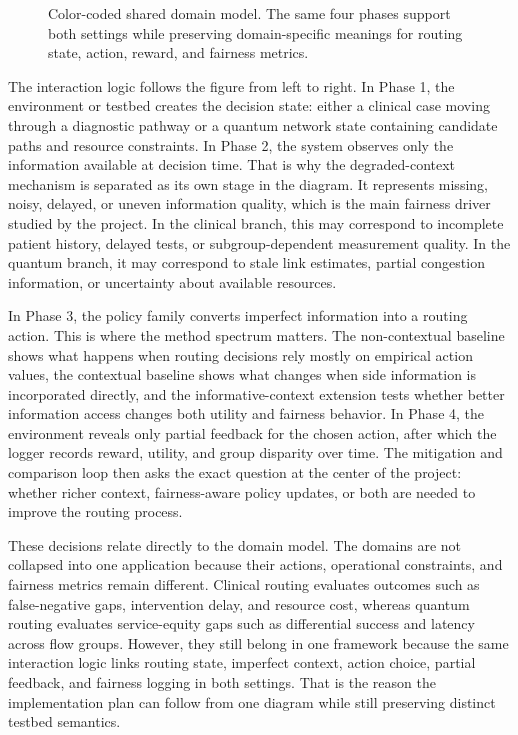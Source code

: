 \documentclass{IEEEtran}
\begin{document}
\begin{figure}[!t]
{%
}
\caption{Color-coded shared domain model. The same four phases support both settings while preserving domain-specific meanings for routing state, action, reward, and fairness metrics.}
\label{fig:domain_model}
\end{figure}

The interaction logic follows the figure from left to right. In Phase 1, the environment or testbed creates the decision state: either a clinical case moving through a diagnostic pathway or a quantum network state containing candidate paths and resource constraints. In Phase 2, the system observes only the information available at decision time. That is why the degraded-context mechanism is separated as its own stage in the diagram. It represents missing, noisy, delayed, or uneven information quality, which is the main fairness driver studied by the project. In the clinical branch, this may correspond to incomplete patient history, delayed tests, or subgroup-dependent measurement quality. In the quantum branch, it may correspond to stale link estimates, partial congestion information, or uncertainty about available resources.

In Phase 3, the policy family converts imperfect information into a routing action. This is where the method spectrum matters. The non-contextual baseline shows what happens when routing decisions rely mostly on empirical action values, the contextual baseline shows what changes when side information is incorporated directly, and the informative-context extension tests whether better information access changes both utility and fairness behavior. In Phase 4, the environment reveals only partial feedback for the chosen action, after which the logger records reward, utility, and group disparity over time. The mitigation and comparison loop then asks the exact question at the center of the project: whether richer context, fairness-aware policy updates, or both are needed to improve the routing process.

These decisions relate directly to the domain model. The domains are not collapsed into one application because their actions, operational constraints, and fairness metrics remain different. Clinical routing evaluates outcomes such as false-negative gaps, intervention delay, and resource cost, whereas quantum routing evaluates service-equity gaps such as differential success and latency across flow groups. However, they still belong in one framework because the same interaction logic links routing state, imperfect context, action choice, partial feedback, and fairness logging in both settings. That is the reason the implementation plan can follow from one diagram while still preserving distinct testbed semantics.
\end{document}
